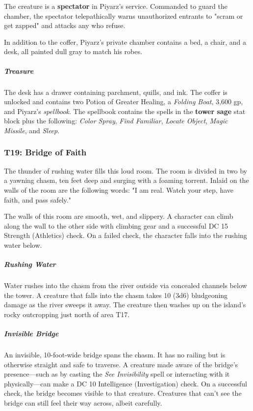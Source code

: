 \documentclass[10pt,a4paper,twoside,bg=print,twocolumn,openany,nodeprecatedcode]{dndbook}
\begin{document}
The creature is a \textbf{spectator} in Piyarz's service. Commanded to guard the chamber, the spectator telepathically warns unauthorized entrants to "scram or get zapped" and attacks any who refuse.

In addition to the coffer, Piyarz's private chamber contains a bed, a chair, and a desk, all painted dull gray to match his robes.

\subparagraph{Treasure}
The desk has a drawer containing parchment, quills, and ink. The coffer is unlocked and contains two Potion of Greater Healing, a \textit{Folding Boat}, 3,600 gp, and Piyarz's \textit{spellbook}. The spellbook contains the spells in the \textbf{tower sage} stat block plus the following: \textit{Color Spray}, \textit{Find Familiar}, \textit{Locate Object}, \textit{Magic Missile}, and \textit{Sleep}.

\subsubsection{T19: Bridge of Faith}
\begin{DndReadAloud}{}
The thunder of rushing water fills this loud room. The room is divided in two by a yawning chasm, ten feet deep and surging with a foaming torrent. Inlaid on the walls of the room are the following words: "I am real. Watch your step, have faith, and pass safely."

\end{DndReadAloud}

The walls of this room are smooth, wet, and slippery. A character can climb along the wall to the other side with climbing gear and a successful DC 15 Strength (Athletics) check. On a failed check, the character falls into the rushing water below.

\subparagraph{Rushing Water}
Water rushes into the chasm from the river outside via concealed channels below the tower. A creature that falls into the chasm takes 10 (3d6) bludgeoning damage as the river sweeps it away. The creature then washes up on the island's rocky outcropping just north of area T17.

\subparagraph{Invisible Bridge}
An invisible, 10-foot-wide bridge spans the chasm. It has no railing but is otherwise straight and safe to traverse. A creature made aware of the bridge's presence—such as by casting the \textit{See Invisibility} spell or interacting with it physically—can make a DC 10 Intelligence (Investigation) check. On a successful check, the bridge becomes visible to that creature. Creatures that can't see the bridge can still feel their way across, albeit carefully.
\end{document}
